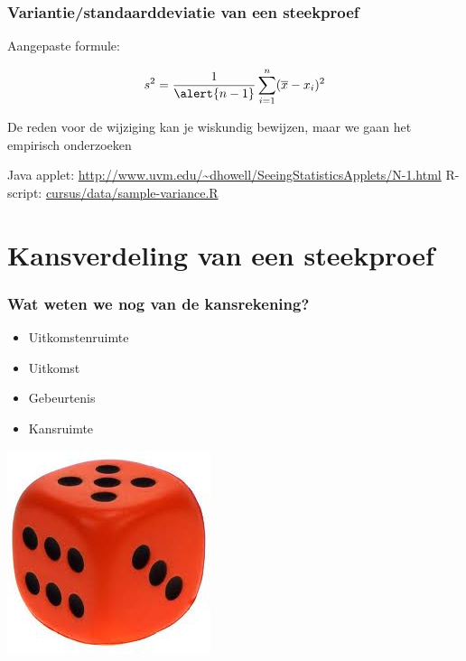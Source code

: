 \documentclass{beamer}
\begin{document}
\begin{frame}
  \frametitle{Variantie/standaarddeviatie van een steekproef}

  \begin{center}
    Aangepaste formule:
    
    \begin{equation*}
    s^2 = \frac{1}{\alert{n-1}} \sum_{i=1}^{n} (\overline{x} - x_i)^2
    \end{equation*}
    
    De reden voor de wijziging kan je wiskundig bewijzen, maar we gaan het empirisch onderzoeken

    \vfill

    Java applet: \url{http://www.uvm.edu/~dhowell/SeeingStatisticsApplets/N-1.html}
    \vfill
    R-script: \href{https://github.com/HoGentTIN/onderzoekstechnieken-cursus/blob/master/cursus/data/sample-variance.R}{cursus/data/sample-variance.R}
  \end{center}
\end{frame}

\section{Kansverdeling van een steekproef}

\begin{frame}
  \frametitle{Wat weten we nog van de kansrekening?}

  \begin{itemize}
    \item Uitkomstenruimte
    \item Uitkomst
    \item Gebeurtenis
    \item Kansruimte
  \end{itemize}

  \vfill

  \hfill \includegraphics[width=.2\textwidth]{img/les04-dobbelsteen}
\end{frame}
\end{document}
